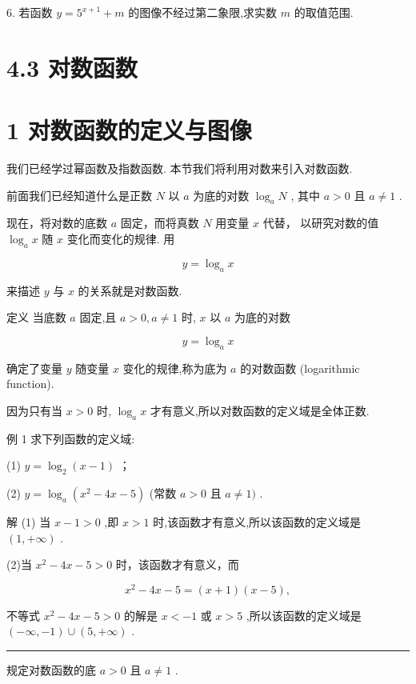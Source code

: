 \documentclass[10pt]{article}
\newcommand{\HRule}{\begin{center}\rule{0.9\linewidth}{0.2mm}\end{center}}
\begin{document}
6. 若函数 \(y = {5}^{x + 1} + m\) 的图像不经过第二象限,求实数 \(m\) 的取值范围.

\section*{4.3 对数函数}

\section*{1 对数函数的定义与图像}

我们已经学过幂函数及指数函数. 本节我们将利用对数来引入对数函数.

前面我们已经知道什么是正数 \(N\) 以 \(a\) 为底的对数 \({\log }_{a}N\) , 其中 \(a > 0\) 且 \(a \neq  1\) .

现在，将对数的底数 \(a\) 固定，而将真数 \(N\) 用变量 \(x\) 代替， 以研究对数的值 \({\log }_{a}x\) 随 \(x\) 变化而变化的规律. 用

\[
y = {\log }_{a}x
\]

来描述 \(y\) 与 \(x\) 的关系就是对数函数.

定义 当底数 \(a\) 固定,且 \(a > 0,a \neq  1\) 时, \(x\) 以 \(a\) 为底的对数

\[
y = {\log }_{a}x
\]

确定了变量 \(y\) 随变量 \(x\) 变化的规律,称为底为 \(a\) 的对数函数 (logarithmic function).

因为只有当 \(x > 0\) 时, \({\log }_{a}x\) 才有意义,所以对数函数的定义域是全体正数.

例 1 求下列函数的定义域:

(1) \(y = {\log }_{2}\left( {x - 1}\right)\) ；

(2) \(y = {\log }_{a}\left( {{x}^{2} - {4x} - 5}\right)\) (常数 \(a > 0\) 且 \(a \neq  1)\) .

解 (1) 当 \(x - 1 > 0\) ,即 \(x > 1\) 时,该函数才有意义,所以该函数的定义域是 \(\left( {1, + \infty }\right)\) .

(2)当 \({x}^{2} - {4x} - 5 > 0\) 时，该函数才有意义，而

\[
{x}^{2} - {4x} - 5 = \left( {x + 1}\right) \left( {x - 5}\right) ,
\]

不等式 \({x}^{2} - {4x} - 5 > 0\) 的解是 \(x <  - 1\) 或 \(x > 5\) ,所以该函数的定义域是 \(\left( {-\infty , - 1}\right)  \cup  \left( {5, + \infty }\right)\) .



\HRule

规定对数函数的底 \(a > 0\) 且 \(a \neq  1\) .
\end{document}
